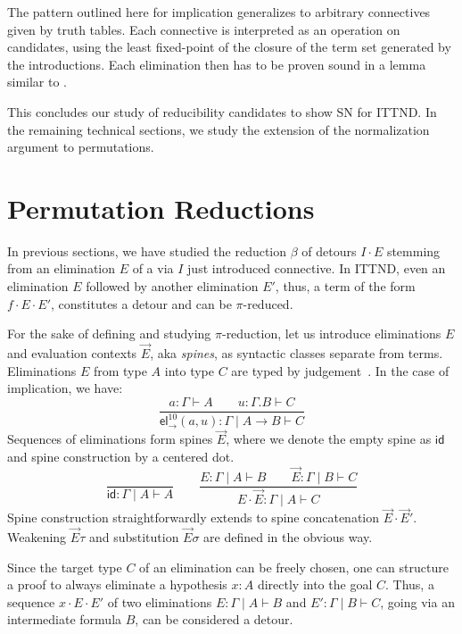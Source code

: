 \documentclass[a4paper,USenglish,cleveref, autoref, thm-restate]{lipics-v2021}
\newcommand{\tid}{\mathsf{id}}
\newcommand{\ru}{\dfrac}
\newcommand{\tel}{\mathsf{el}}
\newcommand{\el}[2]{\ensuremath{\tel_{#1}^{#2}}}
\begin{document}
The pattern outlined here for implication generalizes to arbitrary
connectives given by truth tables.  Each connective is interpreted as
an operation on candidates, using the least fixed-point of the closure
of the term set generated by the introductions.  Each elimination then
has to be proven sound in a lemma similar to .

This concludes our study of reducibility candidates to show SN for ITTND.
In the remaining technical
sections, we study the extension of the normalization argument to
permutations.

\section{Permutation Reductions}
\label{sec:perm}


In previous sections, we have studied the reduction $\beta$ of detours
$I \cdot E$
stemming from an elimination $E$ of a via $I$ just introduced connective.
%
In ITTND, even an elimination $E$ followed by another elimination
$E'$, thus, a term of the form $f \cdot E \cdot E'$, constitutes a
detour and can be $\pi$-reduced.

For the sake of defining and studying $\pi$-reduction, let us
introduce eliminations $E$ and evaluation contexts $\vec E$, aka
\emph{spines}, as syntactic classes separate from terms.  Eliminations
$E$ from type $A$ into type $C$ are typed by judgement
\,.  In the case of implication, we have:
\[
  \ru{a : \Gamma \vdash A \qquad u : \Gamma.B \vdash C
    }{\el\to{10}(a,u) : \Gamma \mid A \to B \vdash C}
\]
Sequences of eliminations form spines $\vec E$, where we
denote the empty spine as $\tid$ and spine construction by a
centered dot.
\[
  \ru{}{\tid : \Gamma \mid A \vdash A}
\qquad
  \ru{E : \Gamma \mid A \vdash B \qquad
      \vec E : \Gamma \mid B \vdash C
    }{E \cdot \vec E : \Gamma \mid A \vdash C}
\]
Spine construction straightforwardly extends to spine
concatenation $\vec E \cdot \vec E'$.
Weakening $\vec E \tau$ and substitution $\vec E \sigma$ are defined
in the obvious way.

Since the target type $C$ of an elimination can be freely chosen, one
can structure a proof to always eliminate a hypothesis $x : A$
directly into the goal $C$.
Thus, a sequence $x \cdot E \cdot E'$ of two eliminations
$E : \Gamma \mid A \vdash B$ and $E' : \Gamma \mid B \vdash C$, going via an
intermediate formula $B$, can be considered a detour.
\end{document}
